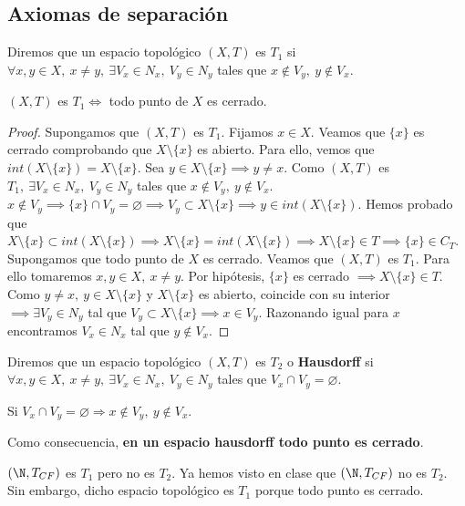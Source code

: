 \subsection{Axiomas de separación}
\begin{ndef}[Separación]
  Diremos que un espacio topológico $(X,T)$ es $T_1$ si $\forall x,y \in X,\ x\neq y,\ \exists V_x \in N_x,\ V_y \in N_y$ tales que $x \not\in V_y,\ y \not\in V_x$.
\end{ndef}
\begin{properties}
  $(X,T)$ es $T_1 \Leftrightarrow$ todo punto de $X$ es cerrado.
\end{properties}
\begin{proof}
  \fbox{$\Rightarrow$} Supongamos que $(X,T)$ es $T_1$. Fijamos $x \in X$. Veamos que $\{x\}$ es cerrado comprobando que $X \setminus \{x\}$ es abierto. Para ello, vemos que $int(X \setminus \{x\})=X \setminus \{x\}$. Sea $y \in X \setminus \{x\} \implies y \neq x$. Como $(X,T)$ es $T_1,\ \exists V_x \in N_x,\ V_y \in N_y$ tales que $x \not\in V_y,\ y \not\in V_x$. $x \not\in V_y \implies \{x\} \cap V_y = \varnothing \implies V_y \subset X \setminus \{x\} \implies y \in int(X \setminus \{x\})$. Hemos probado que  $X \setminus \{x\} \subset int(X \setminus \{x\}) \implies X \setminus \{x\} = int(X \setminus \{x\}) \implies X \setminus \{x\} \in T \implies \{x\} \in C_T$. \\
  \fbox{$\Leftarrow$} Supongamos que todo punto de $X$ es cerrado. Veamos que $(X,T)$ es $T_1$. Para ello tomaremos $x,y \in X,\ x \neq y$. Por hipótesis, $\{x\}$ es cerrado $\implies X \setminus \{x\} \in T$. Como $y \neq x,\ y \in X \setminus \{x\}$ y $X \setminus \{x\}$ es abierto, coincide con su interior $\implies \exists V_y \in N_y$ tal que $V_y \subset X \setminus \{x\} \implies x \in V_y$. Razonando igual para $x$ encontramos $V_x \in N_x$ tal que $y \not\in  V_x$.
\end{proof}

\begin{ndef}
  Diremos que un espacio topológico $(X,T)$ es $T_2$ o \textbf{Hausdorff} si $\forall x,y \in X,\ x \neq y,\ \exists V_x \in N_x,\ V_y \in N_y$ tales que $V_x \cap V_y = \varnothing$.
\end{ndef}
\begin{note}
    Si $V_x \cap V_y = \varnothing \Rightarrow x \not \in V_y,\ y \not \in V_x$.
\end{note}
Como consecuencia, \textbf{en un espacio hausdorff todo punto es cerrado}.

\begin{exmp}
  $(\N,T_{CF})$ es $T_1$ pero no es $T_2$. Ya hemos visto en clase que $(\N,T_{CF})$ no es $T_2$. Sin embargo, dicho espacio topológico es $T_1$ porque todo punto es cerrado.
\end{exmp}

